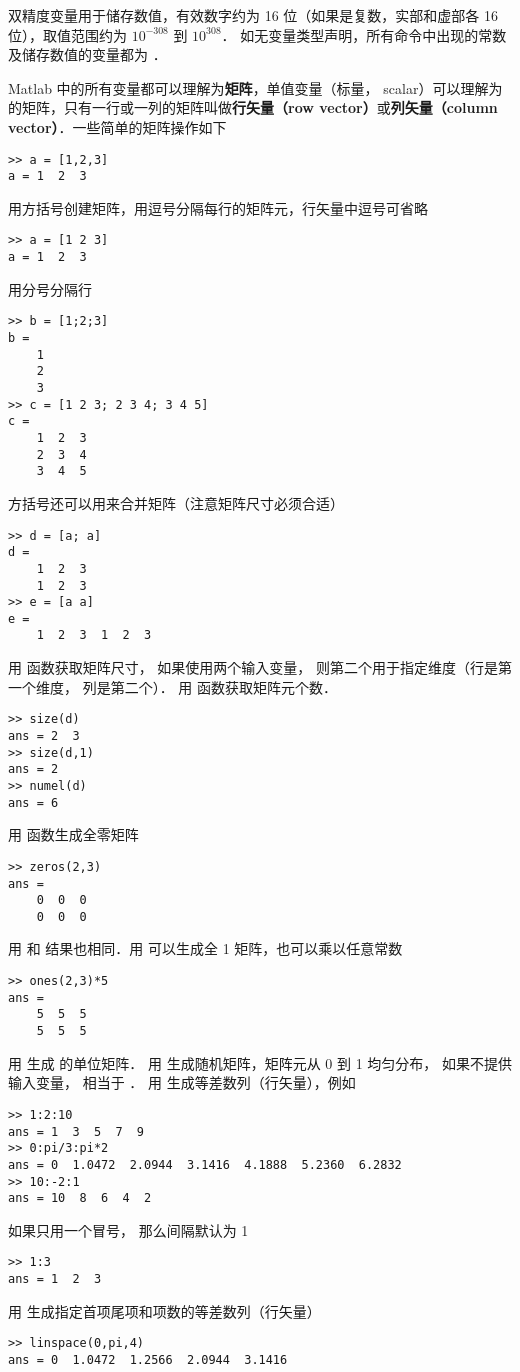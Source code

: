 双精度变量用于储存数值，有效数字约为 16 位（如果是复数，实部和虚部各 16 位），取值范围约为 $10^{-308}$ 到 $10^{308}$． 如无变量类型声明，所有命令中出现的常数及储存数值的变量都为 ．

Matlab 中的所有变量都可以理解为\textbf{矩阵}，单值变量（标量， scalar）可以理解为  的矩阵，只有一行或一列的矩阵叫做\textbf{行矢量（row vector）}或\textbf{列矢量（column vector）}．一些简单的矩阵操作如下
\begin{lstlisting}[language=MatlabCom]
>> a = [1,2,3]
a = 1  2  3
\end{lstlisting}
用方括号创建矩阵，用逗号分隔每行的矩阵元，行矢量中逗号可省略%
\begin{lstlisting}[language=MatlabCom]
>> a = [1 2 3]
a = 1  2  3
\end{lstlisting}
用分号分隔行
\begin{lstlisting}[language=MatlabCom]
>> b = [1;2;3]
b =
    1
    2
    3
>> c = [1 2 3; 2 3 4; 3 4 5]
c =
    1  2  3
    2  3  4
    3  4  5
\end{lstlisting}
方括号还可以用来合并矩阵（注意矩阵尺寸必须合适）
\begin{lstlisting}[language=MatlabCom]
>> d = [a; a]
d =
    1  2  3
    1  2  3
>> e = [a a]
e =
    1  2  3  1  2  3
\end{lstlisting}
用  函数获取矩阵尺寸， 如果使用两个输入变量， 则第二个用于指定维度（行是第一个维度， 列是第二个）． 用  函数获取矩阵元个数．
\begin{lstlisting}[language=MatlabCom]
>> size(d)
ans = 2  3
>> size(d,1)
ans = 2
>> numel(d)
ans = 6
\end{lstlisting}
用  函数生成全零矩阵
\begin{lstlisting}[language=MatlabCom]
>> zeros(2,3)
ans =
    0  0  0
    0  0  0
\end{lstlisting}
用  和  结果也相同．用  可以生成全 1 矩阵，也可以乘以任意常数
\begin{lstlisting}[language=MatlabCom]
>> ones(2,3)*5
ans =
    5  5  5
    5  5  5
\end{lstlisting}
用  生成  的单位矩阵． 用  生成随机矩阵，矩阵元从 0 到 1 均匀分布， 如果不提供输入变量，  相当于 ． 用  生成等差数列（行矢量），例如
\begin{lstlisting}[language=MatlabCom]
>> 1:2:10
ans = 1  3  5  7  9
>> 0:pi/3:pi*2
ans = 0  1.0472  2.0944  3.1416  4.1888  5.2360  6.2832
>> 10:-2:1
ans = 10  8  6  4  2
\end{lstlisting}
如果只用一个冒号， 那么间隔默认为 1
\begin{lstlisting}[language=MatlabCom]
>> 1:3
ans = 1  2  3
\end{lstlisting}
用  生成指定首项尾项和项数的等差数列（行矢量）
\begin{lstlisting}[language=MatlabCom]
>> linspace(0,pi,4)
ans = 0  1.0472  1.2566  2.0944  3.1416
\end{lstlisting}

